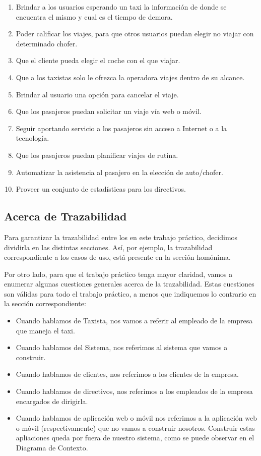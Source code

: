 \documentclass[a4paper, 10pt, twoside]{article}
\begin{document}
\begin{enumerate}
 \item Brindar a los usuarios esperando un taxi la información de donde se encuentra el mismo y cual es el tiempo de demora.
 \item Poder calificar los viajes, para que otros usuarios puedan elegir no viajar con determinado chofer.
 \item Que el cliente pueda elegir el coche con el que viajar.
 \item Que a los taxistas solo le ofrezca la operadora viajes dentro de su alcance.
 \item Brindar al usuario una opción para cancelar el viaje.
 \item Que los pasajeros puedan solicitar un viaje vía web o móvil.
 \item Seguir aportando servicio a los pasajeros sin acceso a Internet o a la tecnología.
 \item Que los pasajeros puedan planificar viajes de rutina.
 \item Automatizar la asistencia al pasajero en la elección de auto/chofer.
 \item Proveer un conjunto de estadísticas para los directivos.
\end{enumerate}

\subsection{Acerca de Trazabilidad}

Para garantizar la trazabilidad entre los en este trabajo práctico, decidimos dividirla en las distintas secciones. Así, por ejemplo, la trazabilidad correspondiente a los casos de uso, está presente en la sección homónima.

Por otro lado, para que el trabajo práctico tenga mayor claridad, vamos a enumerar algunas cuestiones generales acerca de la trazabilidad. Estas cuestiones son válidas para todo el trabajo práctico, a menos que indiquemos lo contrario en la sección correspondiente:

\begin{itemize}
	\item Cuando hablamos de Taxista, nos vamos a referir al empleado de la empresa que maneja el taxi.
	\item Cuando hablamos del Sistema, nos referimos al sistema que vamos a construir.
	\item Cuando hablamos de clientes, nos referimos a los clientes de la empresa.
	\item Cuando hablamos de directivos, nos referimos a los empleados de la empresa encargados de dirigirla.
	\item Cuando hablamos de aplicación web o móvil nos referimos a la aplicación web o móvil (respectivamente) que no vamos a construir nosotros. Construir estas apliaciones queda por fuera de nuestro sistema, como se puede observar en el Diagrama de Contexto.
\end{itemize}
\end{document}
